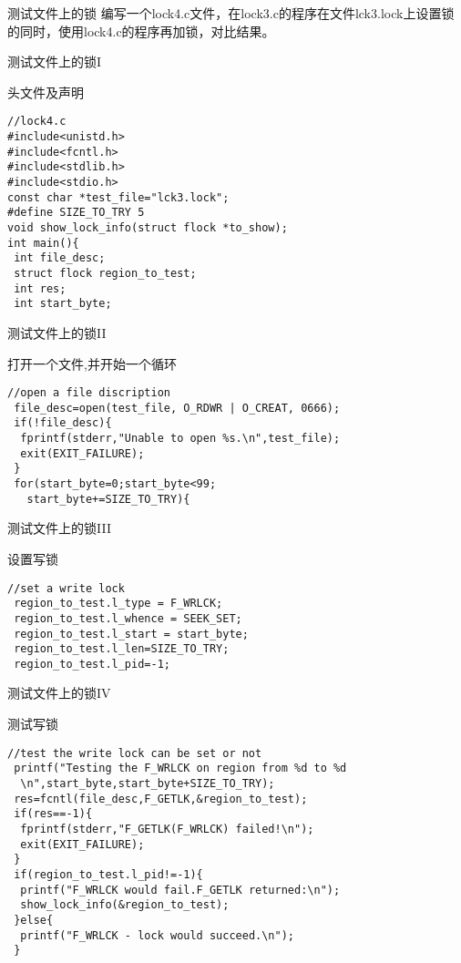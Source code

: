 \documentclass{beamer}
\begin{document}
\begin{frame}{测试文件上的锁}
编写一个lock4.c文件，在lock3.c的程序在文件lck3.lock上设置锁的同时，使用lock4.c的程序再加锁，对比结果。
\end{frame}
\begin{frame}[fragile]{测试文件上的锁I}
\begin{block}{头文件及声明}
\begin{lstlisting}
//lock4.c
#include<unistd.h>
#include<fcntl.h>
#include<stdlib.h>
#include<stdio.h>
const char *test_file="lck3.lock";
#define SIZE_TO_TRY 5
void show_lock_info(struct flock *to_show);
int main(){
 int file_desc;
 struct flock region_to_test;
 int res;
 int start_byte;
\end{lstlisting}
\end{block}
\end{frame}
\begin{frame}[fragile]{测试文件上的锁II}
\begin{block}{打开一个文件,并开始一个循环}
\begin{lstlisting}
//open a file discription
 file_desc=open(test_file, O_RDWR | O_CREAT, 0666);
 if(!file_desc){
  fprintf(stderr,"Unable to open %s.\n",test_file);
  exit(EXIT_FAILURE);
 }
 for(start_byte=0;start_byte<99;
   start_byte+=SIZE_TO_TRY){
\end{lstlisting}
\end{block}
\end{frame}
\begin{frame}[fragile]{测试文件上的锁III}
\begin{block}{设置写锁}
\begin{lstlisting}
//set a write lock	
 region_to_test.l_type = F_WRLCK;
 region_to_test.l_whence = SEEK_SET;
 region_to_test.l_start = start_byte;
 region_to_test.l_len=SIZE_TO_TRY;
 region_to_test.l_pid=-1;	
 \end{lstlisting}
\end{block}
\end{frame}
 \begin{frame}[fragile]{测试文件上的锁IV}
\begin{block}{测试写锁}
\begin{lstlisting}
//test the write lock can be set or not
 printf("Testing the F_WRLCK on region from %d to %d
  \n",start_byte,start_byte+SIZE_TO_TRY);	
 res=fcntl(file_desc,F_GETLK,&region_to_test);
 if(res==-1){
  fprintf(stderr,"F_GETLK(F_WRLCK) failed!\n");
  exit(EXIT_FAILURE);
 }
 if(region_to_test.l_pid!=-1){
  printf("F_WRLCK would fail.F_GETLK returned:\n");
  show_lock_info(&region_to_test);
 }else{
  printf("F_WRLCK - lock would succeed.\n");
 }
\end{lstlisting}
\end{block}
\end{frame}
\end{document}
